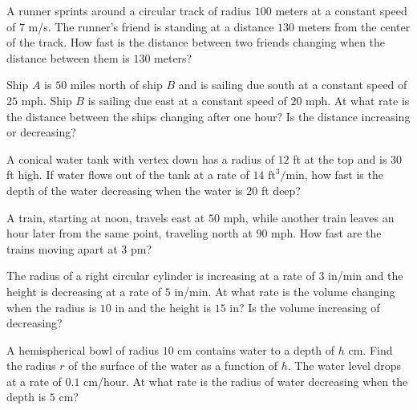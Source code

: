 \begin{multicols}{2}
\problem A runner sprints around a circular track of radius $100$ meters at 
a constant speed of $7$ m/s. The runner's friend is standing at a distance
$130$ meters from the center of the track. How fast is the distance between
two friends changing when the distance between them is $130$ meters?












\problem Ship $A$ is $50$ miles north of ship $B$ and is sailing due south 
at a constant speed of $25$ mph. Ship $B$ is sailing due east at a constant speed of $20$ mph. At what rate is the
distance between the ships changing after one hour? Is the distance
increasing or decreasing?












\problem A conical water tank with vertex down has a radius of $12$ ft at 
the top and is $30$ ft high. If water flows out of the tank at a rate of
  $14$ $\text{ft}^3/\text{min}$, how fast is the depth of the water decreasing when the
water is $20$ ft deep?












\problem A train, starting at noon, travels east at $50$ mph, while another 
train leaves an hour later from the same point, traveling north at $90$ mph. How
fast are the trains moving apart at $3$ pm?












\problem The radius of a right circular cylinder is increasing at a rate of $3$ 
in/min and the height is decreasing at a rate of $5$ in/min. At what rate is the
volume changing when the radius is $10$ in and the height is $15$ in? Is the
volume increasing of decreasing?












\problem A hemispherical bowl of radius $10$ cm contains water to a depth of $h$ 
cm. Find the radius $r$ of the surface of the water as a function of $h$. The
water level drops at a rate of $0.1$ cm/hour. At what rate is the radius of
water decreasing when the depth is $5$ cm?


\end{multicols}
